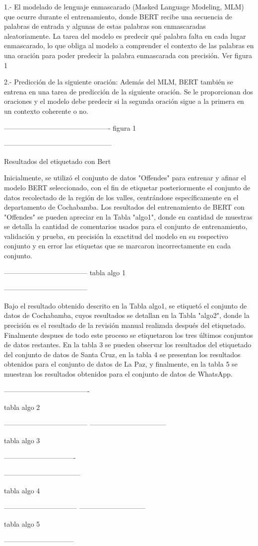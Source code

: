 1.- El modelado de lenguaje enmascarado (Masked Language Modeling, MLM) que ocurre durante el entrenamiento, donde BERT recibe una secuencia de palabras de entrada y algunas de estas palabras son enmascaradas aleatoriamente. La tarea del modelo es predecir qué palabra falta en cada lugar enmascarado, lo que obliga al modelo a comprender el contexto de las palabras en una oración para poder predecir la palabra enmascarada con precisión. Ver figura 1

2.- Predicción de la siguiente oración: Además del MLM, BERT también se entrena en una tarea de predicción de la siguiente oración. Se le proporcionan dos oraciones y el modelo debe predecir si la segunda oración sigue a la primera en un contexto coherente o no.


----------------------------------------------
figura 1

-----------------------------------------------

 Resultados del etiquetado con Bert

Inicialmente, se utilizó el conjunto de datos "Offendes" para entrenar y afinar  el modelo BERT seleccionado, con el fin de etiquetar posteriormente el conjunto de datos recolectado de la región de los valles, centrándose específicamente en el departamento de Cochabamba. Los resultados del entrenamiento de BERT con "Offendes" se pueden apreciar en la Tabla "algo1", donde en cantidad de muestras se detalla la cantidad de comentarios usados para el conjunto de entrenamiento, validación y prueba, en precisión la exactitud del modelo en su respectivo conjunto y en error las etiquetas que se marcaron incorrectamente en cada conjunto.

------------------------------------
tabla algo 1

------------------------------------

Bajo el resultado obtenido descrito en la Tabla algo1, se etiquetó el conjunto de datos de Cochabamba, cuyos resultados se detallan en la Tabla "algo2", donde la precisión es el resultado de la revisión manual realizada después del etiquetado. Finalmente despues de todo este proceso se etiquetaron los tres últimos conjuntos de datos restantes. En la tabla 3 se pueden observar los resultados del etiquetado del conjunto de datos de Santa Cruz, en la tabla 4 se presentan los resultados obtenidos para el conjunto de datos de La Paz, y finalmente, en la tabla 5 se muestran los resultados obtenidos para el conjunto de datos de WhatsApp.


-------------------------------------

tabla algo 2

------------------------------------
---------------------------------

tabla algo 3

-------------------------------

---------------------------------

tabla algo 4

--------------------------------
-----------------------------

tabla algo 5

------------------------------



